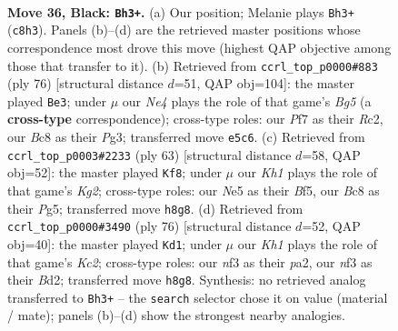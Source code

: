 \documentclass[11pt]{article}
\begin{document}
\clearpage

\begin{figure}[p]\centering
\begin{subfigure}{0.46\textwidth}\centering
\resizebox{\linewidth}{!}{%
\newchessgame
\chessboard[
  setfen={2b4k/R4p1p/5rp1/3Pn3/1p2P3/5NP1/1r5P/5K1R b - - 3 36},
  showmover=false,
  pgfstyle=straightmove, color=movearrow, markmove={c8-h3}
]}
\caption{}
\end{subfigure}\hfill
\begin{subfigure}{0.46\textwidth}\centering
\resizebox{\linewidth}{!}{%
\newchessgame
\chessboard[
  setfen={2r5/3r1k1n/6p1/3p2Bp/2PRp2P/6P1/2R2PK1/8 w - - 1 39},
  showmover=false,
  pgfstyle=straightmove, color=movearrow, markmove={g5-e3}
]}
\caption{}
\end{subfigure}
\\[4pt]
\begin{subfigure}{0.46\textwidth}\centering
\resizebox{\linewidth}{!}{%
\newchessgame
\chessboard[
  setfen={8/1R4k1/2p1r1pp/5bp1/4N3/3r3P/P4PP1/4R1K1 b - - 1 32},
  showmover=false,
  pgfstyle=straightmove, color=movearrow, markmove={g7-f8}
]}
\caption{}
\end{subfigure}\hfill
\begin{subfigure}{0.46\textwidth}\centering
\resizebox{\linewidth}{!}{%
\newchessgame
\chessboard[
  setfen={8/5kp1/r1p2n1p/8/3P2P1/2P2R1P/p1KBrP2/R7 w - - 13 39},
  showmover=false,
  pgfstyle=straightmove, color=movearrow, markmove={c2-d1}
]}
\caption{}
\end{subfigure}
\caption{\textbf{Move 36, Black: \texttt{Bh3+}.} (a) Our position; Melanie plays \texttt{Bh3+} (\texttt{c8h3}). Panels (b)--(d) are the retrieved master positions whose correspondence most drove this move (highest QAP objective among those that transfer to it). (b) Retrieved from \texttt{ccrl\_top\_p0000\#883} (ply 76) [structural distance $d$=51, QAP obj=104]: the master played \texttt{Be3}; under $\mu$ our \emph{Ne4} plays the role of that game's \emph{Bg5} (a \textbf{cross-type} correspondence); cross-type roles: our \emph{P}f7 as their \emph{R}c2, our \emph{B}c8 as their \emph{P}g3; transferred move \texttt{e5c6}. (c) Retrieved from \texttt{ccrl\_top\_p0003\#2233} (ply 63) [structural distance $d$=58, QAP obj=52]: the master played \texttt{Kf8}; under $\mu$ our \emph{Kh1} plays the role of that game's \emph{Kg2}; cross-type roles: our \emph{N}e5 as their \emph{B}f5, our \emph{B}c8 as their \emph{P}g5; transferred move \texttt{h8g8}. (d) Retrieved from \texttt{ccrl\_top\_p0000\#3490} (ply 76) [structural distance $d$=52, QAP obj=40]: the master played \texttt{Kd1}; under $\mu$ our \emph{Kh1} plays the role of that game's \emph{Kc2}; cross-type roles: our \emph{n}f3 as their \emph{p}a2, our \emph{n}f3 as their \emph{B}d2; transferred move \texttt{h8g8}. Synthesis: no retrieved analog transferred to \texttt{Bh3+} -- the \texttt{search} selector chose it on value (material / mate); panels (b)--(d) show the strongest nearby analogies.}
\label{fig:thought-m71}
\end{figure}
\end{document}
